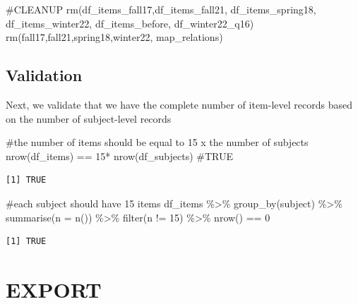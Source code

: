 \documentclass[
  letterpaper,
  DIV=11,
  numbers=noendperiod]{scrreprt}
\newenvironment{Shaded}{\begin{snugshade}}{\end{snugshade}}
\newcommand{\AttributeTok}[1]{\textcolor[rgb]{0.40,0.45,0.13}{#1}}
\newcommand{\CommentTok}[1]{\textcolor[rgb]{0.37,0.37,0.37}{#1}}
\newcommand{\DecValTok}[1]{\textcolor[rgb]{0.68,0.00,0.00}{#1}}
\newcommand{\FunctionTok}[1]{\textcolor[rgb]{0.28,0.35,0.67}{#1}}
\newcommand{\NormalTok}[1]{\textcolor[rgb]{0.00,0.23,0.31}{#1}}
\newcommand{\SpecialCharTok}[1]{\textcolor[rgb]{0.37,0.37,0.37}{#1}}
\begin{document}
\begin{Shaded}
\begin{Highlighting}[]
\CommentTok{\#CLEANUP}
\FunctionTok{rm}\NormalTok{(df\_items\_fall17,df\_items\_fall21, df\_items\_spring18, df\_items\_winter22, df\_items\_before, df\_winter22\_q16)}
\FunctionTok{rm}\NormalTok{(fall17,fall21,spring18,winter22, map\_relations)}
\end{Highlighting}
\end{Shaded}

\hypertarget{validation}{%
\subsection{Validation}\label{validation}}

Next, we validate that we have the complete number of item-level records
based on the number of subject-level records

\begin{Shaded}
\begin{Highlighting}[]
\CommentTok{\#the number of items should be equal to 15 x the number of subjects}
\FunctionTok{nrow}\NormalTok{(df\_items) }\SpecialCharTok{==} \DecValTok{15}\SpecialCharTok{*} \FunctionTok{nrow}\NormalTok{(df\_subjects) }\CommentTok{\#TRUE}
\end{Highlighting}
\end{Shaded}

\begin{verbatim}
[1] TRUE
\end{verbatim}

\begin{Shaded}
\begin{Highlighting}[]
\CommentTok{\#each subject should have 15 items}
\NormalTok{df\_items }\SpecialCharTok{\%\textgreater{}\%} \FunctionTok{group\_by}\NormalTok{(subject) }\SpecialCharTok{\%\textgreater{}\%} \FunctionTok{summarise}\NormalTok{(}\AttributeTok{n =} \FunctionTok{n}\NormalTok{()) }\SpecialCharTok{\%\textgreater{}\%} \FunctionTok{filter}\NormalTok{(n }\SpecialCharTok{!=} \DecValTok{15}\NormalTok{) }\SpecialCharTok{\%\textgreater{}\%} \FunctionTok{nrow}\NormalTok{() }\SpecialCharTok{==} \DecValTok{0}
\end{Highlighting}
\end{Shaded}

\begin{verbatim}
[1] TRUE
\end{verbatim}

\hypertarget{export}{%
\section{EXPORT}\label{export}}
\end{document}
